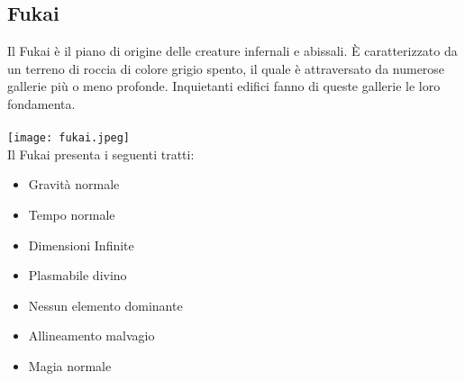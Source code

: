 \documentclass[a4paper]{report}
\begin{document}
\begin{multicols}{2}
\subsection*{Fukai}
Il Fukai è il piano di origine delle creature infernali e abissali. È caratterizzato da un terreno di roccia di colore grigio spento, il quale è attraversato da numerose gallerie più o meno profonde. Inquietanti edifici fanno di queste gallerie le loro fondamenta.\\
\\
\texttt{[image: fukai.jpeg]}
\\
Il Fukai presenta i seguenti tratti:
\begin{itemize}
	\item Gravità normale
	\item Tempo normale
	\item Dimensioni Infinite
	\item Plasmabile divino
	\item Nessun elemento dominante
	\item Allineamento malvagio
	\item Magia normale
\end{itemize}

\end{multicols}
\end{document}
